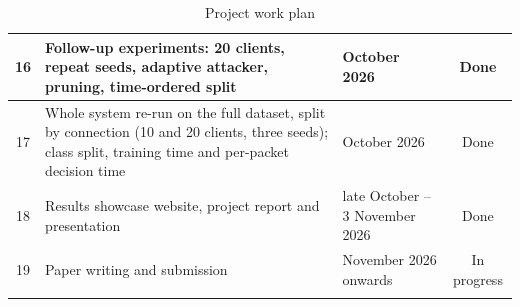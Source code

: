 {\begin{longtable}{|c|p{6.9cm}|>{\raggedright\arraybackslash}p{3cm}|c|}
16 & Follow-up experiments: 20 clients, repeat seeds, adaptive attacker, pruning, time-ordered split & October 2026 & Done \\ \hline
17 & Whole system re-run on the full dataset, split by connection (10 and 20 clients, three seeds); class split, training time and per-packet decision time & October 2026 & Done \\ \hline
18 & Results showcase website, project report and presentation & late October -- 3 November 2026 & Done \\ \hline
19 & Paper writing and submission & November 2026 onwards & In progress \\ \hline
\caption{Project work plan}
\label{tab:workplan}
\end{longtable}}
